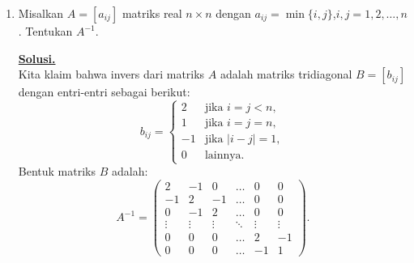 \documentclass[12pt,twoside]{article}
\newenvironment{solution}
{
	\par\noindent\textbf{\underline{Solusi.}}\\
}
{
	\par
}
\begin{document}
\begin{enumerate}
\begin{solution}
          Misalkan $f(z) = a + ib$ dengan $a,b \in \mathbb{R}$.
          Maka $u(x,y) = a$ dan $v(x,y) = b$ untuk semua $(x,y)$.
          Syarat pada soal menjadi $a^3 - 3ab^2 \ge 0$, atau $a(a^2 - 3b^2) \ge 0$.

          Jadi, $u$ dan $v$ adalah fungsi konstan:
          \[ u(x,y) = a, \quad v(x,y) = b \]
          di mana konstanta $a, b$ memenuhi $a(a^2-3b^2) \ge 0$.
        \end{solution}

  \item Misalkan $A=[a_{ij}]$ matriks real $n\times n$ dengan $a_{ij}=\min\{i,j\}$,$i,j=1,2,\dots,n$. Tentukan $A^{-1}$.
        \begin{solution}
          Kita klaim bahwa invers dari matriks $A$ adalah matriks tridiagonal $B = [b_{ij}]$ dengan entri-entri sebagai berikut:
          \[
            b_{ij} = \begin{cases}
              2  & \text{jika } i=j < n, \\
              1  & \text{jika } i=j=n,   \\
              -1 & \text{jika } |i-j|=1, \\
              0  & \text{lainnya.}
            \end{cases}
          \]
          Bentuk matriks $B$ adalah:
          \[
            A^{-1} = \begin{pmatrix}
              2      & -1     & 0      & \dots  & 0      & 0      \\
              -1     & 2      & -1     & \dots  & 0      & 0      \\
              0      & -1     & 2      & \dots  & 0      & 0      \\
              \vdots & \vdots & \vdots & \ddots & \vdots & \vdots \\
              0      & 0      & 0      & \dots  & 2      & -1     \\
              0      & 0      & 0      & \dots  & -1     & 1
            \end{pmatrix}.
          \]


\end{solution}
\end{enumerate}
\end{document}
